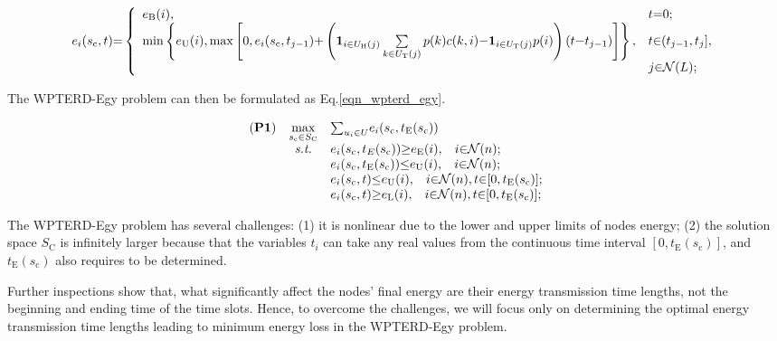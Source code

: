 \documentclass[journal,10pt]{IEEEtran}
\begin{document}
\begin{figure}
\begin{equation}
\label{eqn_energyfun_time}
e_i(s_\text{c},t){=}\left\{
\begin{array}{ll}
e_\text{B}(i), \hspace{3mm}&t{=}0;\\
\min\left\{e_\text{U}(i),
\max\left[0,
e_i(s_\text{c},t_{j{-}1})
{+}\left(
\mathbf{1}_{i{\in}U_\text{H}(j)}
\mathop{\sum}\limits_{k{\in}U_\text{T}(j)}p(k)c(k,i)
{-}
\mathbf{1}_{i{\in}U_\text{T}(j)}p(i)
\right)
(t{-}t_{j{-}1})
\right]
\right\}
,&t{\in}(t_{j{-}1},t_j],\\
&j{\in}\mathcal{N}(L);
\end{array}
\right.
\end{equation}
\end{figure}

The WPTERD-Egy problem can then be formulated as Eq.\eqref{eqn_wpterd_egy}.

\begin{equation}
\label{eqn_wpterd_egy}
\begin{array}{rcl}
(\textbf{P1})&\mathop{\max}\limits_{s_\text{c}{\in}S_\text{C}}&{\sum}_{u_i{\in}U}e_i(s_\text{c},t_\text{E}(s_\text{c}))\\
&\textit{s.t.}&e_i(s_\text{c},t_E(s_\text{c})){\geq}e_\text{E}(i),\hspace{3mm}i{\in}\mathcal{N}(n);\\
&&e_i(s_\text{c},t_\text{E}(s_\text{c})){\leq}e_\text{U}(i),\hspace{3mm}i{\in}\mathcal{N}(n);\\
&&e_i(s_\text{c},t){\leq}e_\text{U}(i),\hspace{3mm}i{\in}\mathcal{N}(n),t{\in}[0,t_\text{E}(s_\text{c})];\\
&&e_i(s_\text{c},t){\geq}e_\text{L}(i),\hspace{3mm}i{\in}\mathcal{N}(n),t{\in}[0,t_\text{E}(s_\text{c})];
\end{array}
\end{equation}

The WPTERD-Egy problem has several challenges: (1) it is nonlinear due to the lower and upper limits of nodes energy; (2) the solution space $S_\text{C}$ is infinitely larger because that the variables $t_i$ can take any real values from the continuous time interval $[0, t_\text{E}(s_\text{c})]$, and $t_\text{E}(s_\text{c})$ also requires to be determined.

Further inspections show that, what significantly affect the nodes' final energy are their energy transmission time lengths, not the beginning and ending time of the time slots. Hence, to overcome the challenges, we will focus only on determining the optimal energy transmission time lengths leading to minimum energy loss in the WPTERD-Egy problem.
\end{document}
